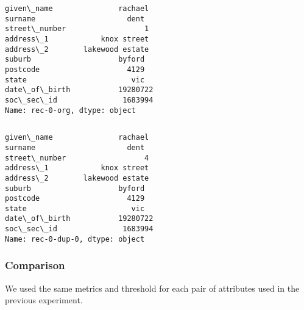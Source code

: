 \documentclass{article}
\begin{document}
    \begin{Verbatim}[commandchars=\\\{\}]

\end{Verbatim}
\begin{Verbatim}[commandchars=\\\{\}]
given\_name               rachael
surname                     dent
street\_number                  1
address\_1            knox street
address\_2        lakewood estate
suburb                    byford
postcode                    4129
state                        vic
date\_of\_birth           19280722
soc\_sec\_id               1683994
Name: rec-0-org, dtype: object
\end{Verbatim}
    \begin{Verbatim}[commandchars=\\\{\}]

\end{Verbatim}
\begin{Verbatim}[commandchars=\\\{\}]
given\_name               rachael
surname                     dent
street\_number                  4
address\_1            knox street
address\_2        lakewood estate
suburb                    byford
postcode                    4129
state                        vic
date\_of\_birth           19280722
soc\_sec\_id               1683994
Name: rec-0-dup-0, dtype: object
\end{Verbatim}
    \hypertarget{comparison}{%
\subsubsection{Comparison}\label{comparison}}

We used the same metrics and threshold for each pair of attributes used
in the previous experiment.
\end{document}
